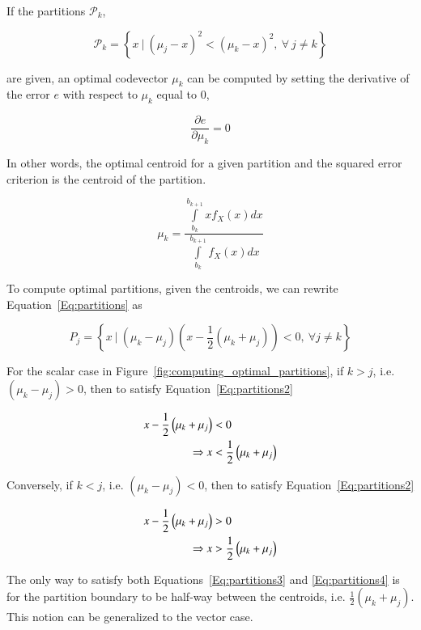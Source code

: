 If the partitions $\mathcal{P}_k$,

\begin{equation}
\label{Eq:partitions}
\mathcal{P}_k =  \left\{x \ | \ (\mu_j-x)^2 < (\mu_k-x)^2, \ \forall \ j \neq k \right\}
\end{equation}

are given, an optimal codevector $\mu_k$ can be computed by setting the derivative of the error $e$ with respect to $\mu_k$ equal to 0,

\begin{equation}
\frac{\partial{e}}{\partial{\mu_k}} = 0
\end{equation}

In other words, the optimal centroid for a given partition and the squared error criterion is the centroid of the partition. 

\begin{equation}
\mu_k = \frac
{\int\limits_{b_k}^{b_{k+1}}xf_X(x)dx}
{\int\limits_{b_k}^{b_{k+1}}f_X(x)dx}
\end{equation}

To compute optimal partitions, given the centroids, we can rewrite Equation~\ref{Eq:partitions} as 

\begin{equation}
\label{Eq:partitions2}
P_j=\left\{x \ | \ (\mu_k -\mu_j) \left(x - \frac{1}{2} \left(\mu_k + \mu_j \right)\right) < 0, \ \forall j \neq k 
\right\}
\end{equation}

For the scalar case in Figure~\ref{fig:computing_optimal_partitions}, if $k>j$, i.e. $(\mu_k -\mu_j) > 0$, then to satisfy Equation~\ref{Eq:partitions2}

\begin{align}
\label{Eq:partitions3}
x - \frac{1}{2} \left(\mu_k + \mu_j \right) &< 0\notag\\
\Rightarrow x &< \frac{1}{2} \left(\mu_k + \mu_j \right)
\end{align}

Conversely, if $k<j$, i.e. $(\mu_k -\mu_j) < 0$, then to satisfy Equation~\ref{Eq:partitions2}

\begin{align}
\label{Eq:partitions4}
x - \frac{1}{2} \left(\mu_k + \mu_j \right) &> 0 \notag\\
\Rightarrow x &> \frac{1}{2} \left(\mu_k + \mu_j \right)
\end{align}

The only way to satisfy both Equations~\ref{Eq:partitions3} and \ref{Eq:partitions4} is for the partition boundary to be half-way between the centroids, i.e. $\frac{1}{2} \left(\mu_k + \mu_j \right)$.  This notion can be generalized to the vector case.

